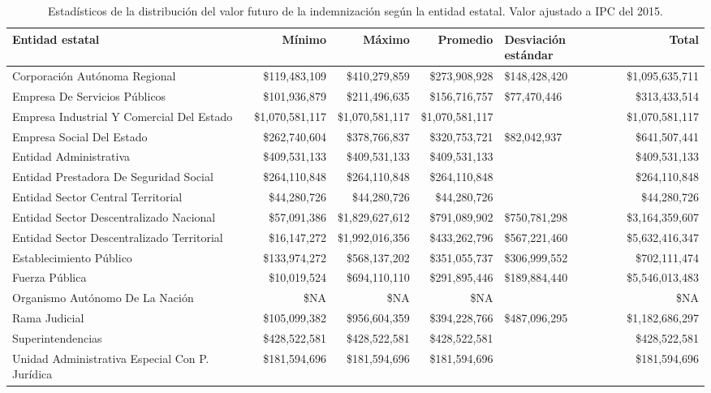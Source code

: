 \begin{sidewaystable}[htbp]
\centering
\caption{Estadísticos de la distribución del
valor futuro de la indemnización según la entidad estatal. Valor ajustado a IPC del 2015.} 
\label{tab:indementidad}
\begin{tabular}{p{6cm}rrrR{2.8cm}r}
  \hline
Entidad estatal & Mínimo & Máximo & Promedio & Desviación estándar & Total \\ 
  \hline
Corporación Autónoma Regional & \$119,483,109 & \$410,279,859 & \$273,908,928 & \$148,428,420 & \$1,095,635,711 \\ 
  Empresa De Servicios Públicos & \$101,936,879 & \$211,496,635 & \$156,716,757 & \$77,470,446 & \$313,433,514 \\ 
  Empresa Industrial Y Comercial Del Estado & \$1,070,581,117 & \$1,070,581,117 & \$1,070,581,117 &  & \$1,070,581,117 \\ 
  Empresa Social Del Estado & \$262,740,604 & \$378,766,837 & \$320,753,721 & \$82,042,937 & \$641,507,441 \\ 
  Entidad Administrativa & \$409,531,133 & \$409,531,133 & \$409,531,133 &  & \$409,531,133 \\ 
  Entidad Prestadora De Seguridad Social & \$264,110,848 & \$264,110,848 & \$264,110,848 &  & \$264,110,848 \\ 
  Entidad Sector Central Territorial & \$44,280,726 & \$44,280,726 & \$44,280,726 &  & \$44,280,726 \\ 
  Entidad Sector Descentralizado Nacional & \$57,091,386 & \$1,829,627,612 & \$791,089,902 & \$750,781,298 & \$3,164,359,607 \\ 
  Entidad Sector Descentralizado Territorial & \$16,147,272 & \$1,992,016,356 & \$433,262,796 & \$567,221,460 & \$5,632,416,347 \\ 
  Establecimiento Público & \$133,974,272 & \$568,137,202 & \$351,055,737 & \$306,999,552 & \$702,111,474 \\ 
  Fuerza Pública & \$10,019,524 & \$694,110,110 & \$291,895,446 & \$189,884,440 & \$5,546,013,483 \\ 
  Organismo Autónomo De La Nación & \$NA & \$NA & \$NA &  & \$NA \\ 
  Rama Judicial & \$105,099,382 & \$956,604,359 & \$394,228,766 & \$487,096,295 & \$1,182,686,297 \\ 
  Superintendencias & \$428,522,581 & \$428,522,581 & \$428,522,581 &  & \$428,522,581 \\ 
  Unidad Administrativa Especial Con P. Jurídica & \$181,594,696 & \$181,594,696 & \$181,594,696 &  & \$181,594,696 \\ 
   \hline
\end{tabular}
\end{sidewaystable}
